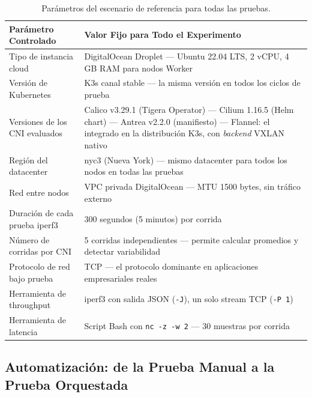 \begin{table}[htbp]
\centering
\scriptsize
\caption{Parámetros del escenario de referencia para todas las pruebas.}
\label{tab:baseline-pruebas}
\begin{tabularx}{\textwidth}{|Y|Y|}
\hline
\textbf{Parámetro Controlado} & \textbf{Valor Fijo para Todo el Experimento} \\
\hline
Tipo de instancia cloud & DigitalOcean Droplet --- Ubuntu 22.04 LTS, 2 vCPU, 4 GB RAM para nodos Worker \\
\hline
Versión de Kubernetes & K3s canal stable --- la misma versión en todos los ciclos de prueba \\
\hline
Versiones de los CNI evaluados & Calico v3.29.1 (Tigera Operator) --- Cilium 1.16.5 (Helm chart) --- Antrea v2.2.0 (manifiesto) --- Flannel: el integrado en la distribución K3s, con \emph{backend} VXLAN nativo \\
\hline
Región del datacenter & nyc3 (Nueva York) --- mismo datacenter para todos los nodos en todas las pruebas \\
\hline
Red entre nodos & VPC privada DigitalOcean --- MTU 1500 bytes, sin tráfico externo \\
\hline
Duración de cada prueba iperf3 & 300 segundos (5 minutos) por corrida \\
\hline
Número de corridas por CNI & 5 corridas independientes --- permite calcular promedios y detectar variabilidad \\
\hline
Protocolo de red bajo prueba & TCP --- el protocolo dominante en aplicaciones empresariales reales \\
\hline
Herramienta de throughput & iperf3 con salida JSON (\texttt{-J}), un solo stream TCP (\texttt{-P 1}) \\
\hline
Herramienta de latencia & Script Bash con \texttt{nc -z -w 2} --- 30 muestras por corrida \\
\hline
\end{tabularx}
\end{table}

\subsection{Automatización: de la Prueba Manual a la Prueba Orquestada}

